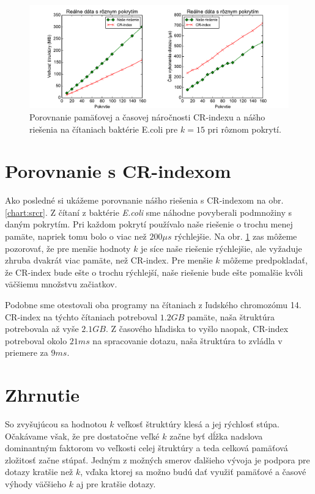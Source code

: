 \begin{figure}

\centerline{\includegraphics[width=1\textwidth]{images/chart_srcr_15.pdf}}

\caption[Porovnanie CR-indexu a našej štruktúry pre $k = 15$]{Porovnanie pamäťovej a časovej náročnosti
CR-indexu a nášho riešenia na čítaniach baktérie E.coli pre $k=15$ pri rôznom pokrytí.}

\label{chart:srcr_15}

\end{figure}


\section{Porovnanie s CR-indexom}

Ako posledné si ukážeme porovnanie nášho riešenia s CR-indexom na obr. \ref{chart:srcr}.
Z čítaní z baktérie \emph{E.coli} sme náhodne povyberali podmnožiny s daným pokrytím. Pri každom
pokrytí používalo naše riešenie o trochu menej pamäte, napriek tomu bolo o viac než $200\mu s$
rýchlejšie. Na obr. \ref{chart:srcr_15} zas môžeme pozorovať, že pre menšie hodnoty $k$ je
síce naše riešenie rýchlejšie, ale vyžaduje zhruba dvakrát viac pamäte, než CR-index.
Pre menšie $k$ môžeme predpokladať, že CR-index bude ešte o trochu rýchlejší, naše riešenie
bude ešte pomalšie kvôli väčšiemu množstvu začiatkov.

Podobne sme otestovali oba programy na čítaniach z ľudského chromozómu 14. CR-index na týchto čítaniach
potreboval $1.2GB$ pamäte, naša štruktúra potrebovala až vyše $2.1GB$. Z časového hľadiska
to vyšlo naopak, CR-index potreboval okolo $21ms$ na spracovanie dotazu, naša štruktúra
to zvládla v priemere za $9ms$.

\section{Zhrnutie}

So zvyšujúcou sa hodnotou $k$
veľkosť štruktúry klesá a jej rýchlosť stúpa. Očakávame však, že pre dostatočne veľké $k$ začne byť
dĺžka nadslova dominantným faktorom vo veľkosti celej štruktúry a teda celková pamäťová
zložitosť začne stúpať. Jedným
z možných smerov ďalšieho vývoja je podpora pre dotazy kratšie než $k$, vďaka ktorej sa možno
budú dať využiť pamäťové a časové výhody väčšieho $k$ aj pre kratšie dotazy.


